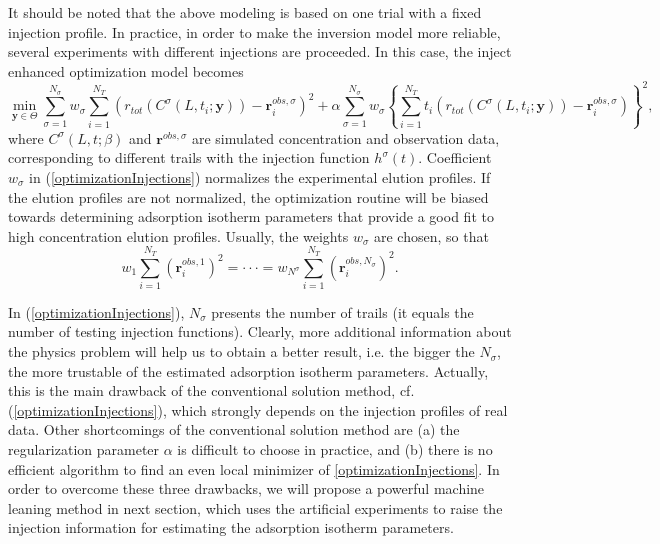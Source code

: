\documentclass[thmsa,onecolumn,12pt]{article}%
\begin{document}
It should be noted that the above modeling is based on one trial with a fixed injection profile. In practice, in order to make the inversion model more reliable, several experiments with different  injections are proceeded. In this case, the inject enhanced optimization model becomes
\begin{equation}\label{optimizationInjections}
\min_{\mathbf{y}\in \Theta} \sum^{N_\sigma}_{\sigma=1} w_\sigma \sum^{N_T}_{i=1} \left( r_{tot}(C^\sigma(L,t_i;\mathbf{y}) )- \mathbf{r}^{obs,\sigma}_i \right)^2 + \alpha \sum^{N_\sigma}_{\sigma=1} w_\sigma  \left\{ \sum^{N_T}_{i=1} t_i\left( r_{tot}(C^\sigma(L,t_i;\mathbf{y}) )- \mathbf{r}^{obs,\sigma}_i \right) \right\}^2,
\end{equation}
where $C^\sigma(L,t;\beta)$ and $\mathbf{r}^{obs,\sigma}$ are simulated concentration and observation data, corresponding to different trails with the injection function $h^\sigma(t)$. Coefficient $w_\sigma$ in (\ref{optimizationInjections}) normalizes the experimental elution profiles. If the elution profiles are not normalized, the optimization routine will be biased towards determining adsorption isotherm parameters that provide a good fit to high concentration elution profiles. Usually, the weights $w_\sigma$ are chosen, so that
\begin{equation*}\label{normalized}
w_1  \sum^{N_T}_{i=1} \left( \mathbf{r}^{obs,1}_i \right)^2 = \cdot\cdot\cdot = w_{N^\sigma}  \sum^{N_T}_{i=1} \left(  \mathbf{r}^{obs,N_\sigma}_i \right)^2.
\end{equation*}


In (\ref{optimizationInjections}), $N_\sigma$ presents the number of trails (it equals the number of testing injection functions). Clearly, more additional information about the physics problem will help us to obtain a better result, i.e. the bigger the $N_\sigma$, the more trustable of the estimated adsorption isotherm parameters. Actually, this is the main drawback of the conventional solution method, cf. (\ref{optimizationInjections}), which strongly depends on the injection profiles of real data. Other shortcomings of the conventional solution method are (a) the regularization parameter $\alpha$ is difficult to choose in practice, and (b) there is no efficient algorithm to find an even local minimizer of  \eqref{optimizationInjections}. In order to overcome these three drawbacks, we will propose a powerful machine leaning method in next section, which uses the artificial experiments to raise the injection information for estimating the adsorption isotherm parameters.
\end{document}
